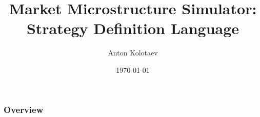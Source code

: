 \documentclass{beamer}
\title[FiQuant Market Simulator]{Market Microstructure Simulator: Strategy Definition Language} %
\author{Anton Kolotaev} %
\institute[ECP] %
{
Chair of Quantitative Finance, \'{E}cole Centrale Paris \\ %
\medskip
\textit{anton.kolotaev@gmail.com} %
}
\date{\today} %
\begin{document}
\begin{frame}
\titlepage %
\end{frame}

\begin{frame}
\frametitle{Overview} %
\tableofcontents %
\end{frame}


\end{document}
